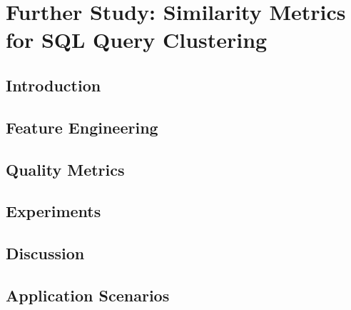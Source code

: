\chapter{Further Study: Similarity Metrics for SQL Query Clustering}

\section{Introduction}
\label{sec:introduction}



%

\section{Feature Engineering}
\label{sec:system}


\section{Quality Metrics}
\label{sec:dcabench}


\section{Experiments}
\label{sec:experiment}


\section{Discussion}
\label{sec:discussion}


\section{Application Scenarios}
\label{sec:scenarios}


%